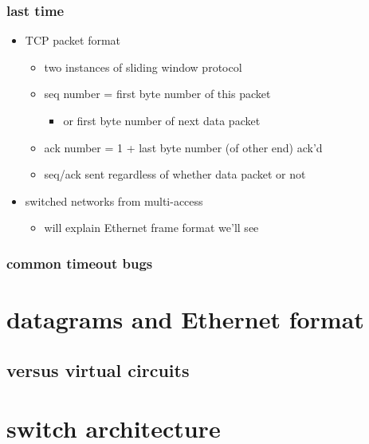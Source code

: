 \date{}
\title{}
\date{}

\begin{frame}
    \titlepage
\end{frame}

\begin{frame}
\frametitle{last time}
\begin{itemize}
\item TCP packet format
    \begin{itemize}
    \item two instances of sliding window protocol
    \item seq number = first byte number of this packet
        \begin{itemize}
        \item or first byte number of next data packet
        \end{itemize}
    \item ack number = 1 + last byte number (of other end) ack'd
    \item seq/ack sent regardless of whether data packet or not
    \end{itemize}
\item switched networks from multi-access
    \begin{itemize}
    \item will explain Ethernet frame format we'll see
    \end{itemize}
\end{itemize}
\end{frame}

\begin{frame}
\frametitle{common timeout bugs}
\end{frame}


\section{datagrams and Ethernet format}




\subsection{versus virtual circuits}



\section{switch architecture}

